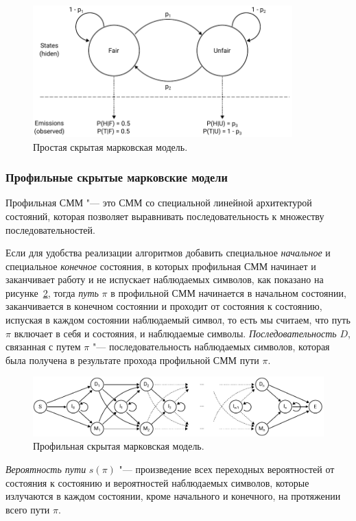\documentclass[specialist,
substylefile = spbu_report.rtx,
subf,href,colorlinks=true, 12pt]{disser}
\begin{document}
			\begin{figure}[h]
				\includegraphics[width=10cm]{figure1}
				\centering
				\caption{Простая скрытая марковская модель.} \label{fg:2}
			\end{figure}
		
			\subsubsection{Профильные скрытые марковские модели}
			Профильная СММ "--- это СММ со специальной линейной архитектурой состояний, которая позволяет выравнивать последовательность к множеству последовательностей.						
									
			Если для удобства реализации алгоритмов добавить специальное \textit{начальное} и специальное \textit{конечное} состояния, в которых профильная СММ начинает и заканчивает работу и не испускает наблюдаемых символов, как показано на рисунке~\ref{fg:3}, тогда \textit{путь} $\pi$ в профильной СММ начинается в начальном состоянии, заканчивается в конечном состоянии и проходит от состояния к состоянию, испуская в каждом состоянии наблюдаемый символ, то есть мы считаем, что путь $\pi$ включает в себя и состояния, и наблюдаемые символы. \textit{Последовательность} $D$, связанная с путем $\pi$ "--- последовательность наблюдаемых символов, которая была получена в результате прохода профильной СММ пути $\pi$. 
			
			\begin{figure}[h]
				\includegraphics[width=15cm]{figure2}
				\centering
				\caption{Профильная скрытая марковская модель.}  \label{fg:3}
			\end{figure}
						
			\textit{Вероятность пути} $s(\pi)$ "--- произведение всех переходных вероятностей от состояния к состоянию и вероятностей наблюдаемых символов, которые излучаются в каждом состоянии, кроме начального и конечного, на протяжении всего пути $\pi$. 
			
\end{document}
